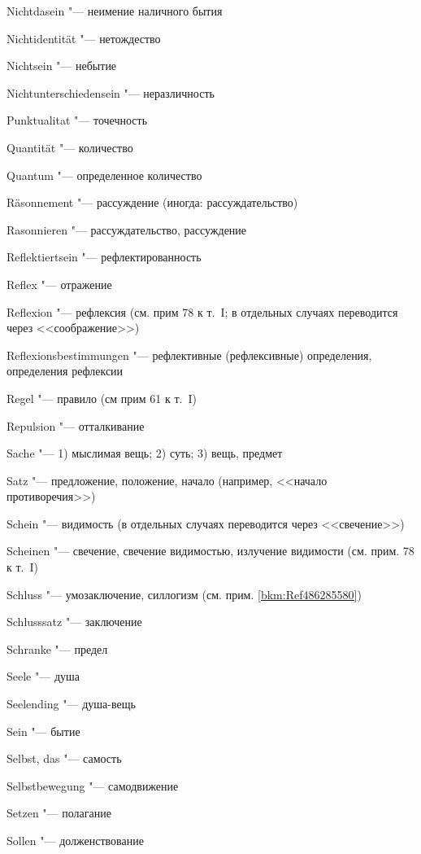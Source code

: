 \begin{multicols}{2}
Nichtdasein "--- неимение наличного бытия

Nichtidentität "--- нетождество

Nichtsein "--- небытие

Nichtunterschiedensein "--- неразличность

\bigskip

Punktualitat "--- точечность

\bigskip

Quantität "--- количество

Quantum "--- определенное количество

\bigskip

Räsonnement "--- рассуждение (иногда: рассуждательство)

Rasonnieren "--- рассуждательство, рассуждение

Reflektiertsein "--- рефлектированность

Reflex "--- отражение

Reflexion "--- рефлексия (см. прим 78 к т.~I; в отдельных случаях
переводится через <<соображение>>)

Reflexionsbestimmungen "--- рефлективные (рефлексивные)
определения, определения рефлексии

Regel "--- правило (см прим 61 к т.~I)

Repulsion "--- отталкивание

\bigskip

Sache "--- 1) мыслимая вещь; 2) суть; 3) вещь, предмет

Satz "--- предложение, положение, начало (например, <<начало противоречия>>)

Schein "--- видимость (в отдельных случаях переводится через <<свечение>>)

Scheinen "--- свечение, свечение видимостью, излучение видимости
(см. прим. 78 к т.~I)

Schluss "--- умозаключение, силлогизм (см. прим. \ref{bkm:Ref486285580})

Schlusssatz "--- заключение

Schranke "--- предел

Seele "--- душа

Seelending "--- душа-вещь

Sein "--- бытие

Selbst, das "--- самость

Selbstbewegung "--- самодвижение

Setzen "--- полагание

Sollen "--- долженствование


\end{multicols}

